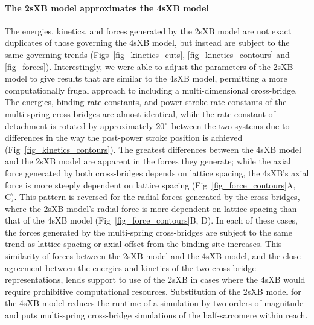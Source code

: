\documentclass[10pt]{article}
\newcommand{\de}{$^\circ$} %
\begin{document}
\paragraph*{The 2sXB model approximates the 4sXB model} %
The energies, kinetics, and forces generated by the 2sXB model are not exact duplicates of those governing the 4sXB model, but instead are subject to the same governing trends (Figs~\ref{fig_kinetics_cuts}, \ref{fig_kinetics_contours} and \ref{fig_forces}). 
Interestingly, we were able to adjust the parameters of the 2sXB model to give results that are similar to the 4sXB model, permitting a more computationally frugal approach to including a multi-dimensional cross-bridge.
The energies, binding rate constants, and power stroke rate constants of the multi-spring cross-bridges are almost identical, while the rate constant of detachment is rotated by approximately 20\de~between the two systems due to differences in the way the post-power stroke position is achieved (Fig~\ref{fig_kinetics_contours}).
The greatest differences between the 4sXB model and the 2sXB model are apparent in the forces they generate; while the axial force generated by both cross-bridges depends on lattice spacing, the 4sXB's axial force is more steeply dependent on lattice spacing (Fig~\ref{fig_force_contours}A, C). 
This pattern is reversed for the radial forces generated by the cross-bridges, where the 2sXB model's radial force is more dependent on lattice spacing than that of the 4sXB model (Fig~\ref{fig_force_contours}B, D).  
In each of these cases, the forces generated by the multi-spring cross-bridges are subject to the same trend as lattice spacing or axial offset from the binding site increases.
This similarity of forces between the 2sXB model and the 4sXB model, and the close agreement between the energies and kinetics of the two cross-bridge representations, lends support to use of the 2sXB in cases where the 4sXB would require prohibitive computational resources.
Substitution of the 2sXB model for the 4sXB model reduces the runtime of a simulation by two orders of magnitude and puts multi-spring cross-bridge simulations of the half-sarcomere within reach.
\end{document}
